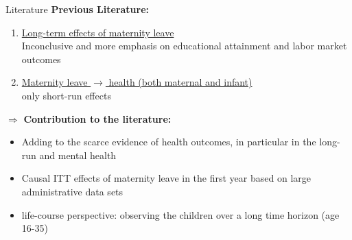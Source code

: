 \documentclass[aspectratio=169,handout]{beamer} %
\begin{document}
\begin{frame}{Literature}
\textbf{Previous Literature:}
\begin{enumerate}
\item \underline{Long-term effects of maternity leave}\\ Inconclusive and more emphasis on educational attainment and labor market outcomes
\item \underline{Maternity leave $\rightarrow$ health (both maternal and infant)} \\only short-run effects
\end{enumerate}\pause
\bigskip
$\Rightarrow$ \textbf{Contribution to the literature:}
\begin{itemize}
\item Adding to the scarce evidence of health outcomes, in particular in the long-run and mental health

\item Causal ITT effects of maternity leave in the first year based on large administrative data sets

\item life-course perspective: observing the children over a long time horizon (age 16-35)



\end{itemize}
\end{frame}



\end{document}
